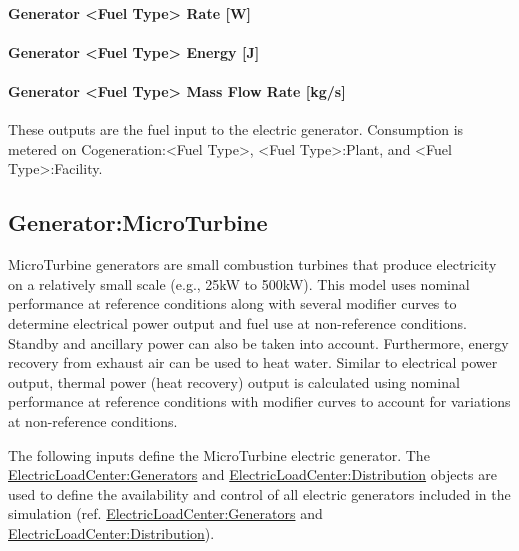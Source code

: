 \paragraph{Generator \textless{}Fuel Type\textgreater{} Rate {[}W{]}}\label{generator-fuel-type-rate-w-1}

\paragraph{Generator \textless{}Fuel Type\textgreater{} Energy {[}J{]}}\label{generator-fuel-type-energy-j-1}

\paragraph{Generator \textless{}Fuel Type\textgreater{} Mass Flow Rate {[}kg/s{]}}\label{generator-fuel-type-mass-flow-rate-kgs-1}

These outputs are the fuel input to the electric generator. Consumption is metered on Cogeneration:\textless{}Fuel Type\textgreater{}, \textless{}Fuel Type\textgreater{}:Plant, and \textless{}Fuel Type\textgreater{}:Facility.

\subsection{Generator:MicroTurbine}\label{generatormicroturbine}

MicroTurbine generators are small combustion turbines that produce electricity on a relatively small scale (e.g., 25kW to 500kW). This model uses nominal performance at reference conditions along with several modifier curves to determine electrical power output and fuel use at non-reference conditions. Standby and ancillary power can also be taken into account. Furthermore, energy recovery from exhaust air can be used to heat water. Similar to electrical power output, thermal power (heat recovery) output is calculated using nominal performance at reference conditions with modifier curves to account for variations at non-reference conditions.

The following inputs define the MicroTurbine electric generator. The \hyperref[electricloadcentergenerators]{ElectricLoadCenter:Generators} and \hyperref[electricloadcenterdistribution]{ElectricLoadCenter:Distribution} objects are used to define the availability and control of all electric generators included in the simulation (ref. \hyperref[electricloadcentergenerators]{ElectricLoadCenter:Generators} and \hyperref[electricloadcenterdistribution]{ElectricLoadCenter:Distribution}).

